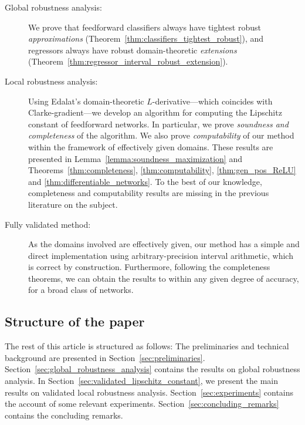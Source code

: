 \documentclass[11pt,times]{article}
\begin{document}
\begin{description}
\item[Global robustness analysis:] We prove that feedforward
  classifiers always have tightest robust \emph{approximations}
  (Theorem~\ref{thm:classifiers_tightest_robust}), and regressors always
  have robust domain-theoretic \emph{extensions}
  (Theorem~\ref{thm:regressor_interval_robust_extension}).


\item[Local robustness analysis:] Using Edalat's domain-theoretic
  $L$-derivative---which coincides with Clarke-gradient---we develop
  an algorithm for computing the Lipschitz constant of feedforward
  networks. In particular, we prove \emph{soundness and completeness}
  of the algorithm. We also prove \emph{computability} of our method
  within the framework of effectively given domains. These results are
  presented in Lemma~\ref{lemma:soundness_maximization} and
  Theorems~\ref{thm:completeness}, \ref{thm:computability},
  \ref{thm:gen_pos_ReLU} and \ref{thm:differentiable_networks}. To the
  best of our knowledge, completeness and computability results are
  missing in the previous literature on the subject.

\item[Fully validated method:] As the domains involved are effectively
  given, our method has a simple and direct implementation using
  arbitrary-precision interval arithmetic, which is correct by
  construction. Furthermore, following the completeness theorems, we
  can obtain the results to within any given degree of accuracy, for a
  broad class of networks. 

\end{description}




\subsection{Structure of the paper}

The rest of this article is structured as follows: The preliminaries
and technical background are presented in
Section~\ref{sec:preliminaries}. Section~\ref{sec:global_robustness_analysis}
contains the results on global robustness analysis. In
Section~\ref{sec:validated_lipschitz_constant}, we present the main
results on validated local robustness
analysis. Section~\ref{sec:experiments} contains the account of some
relevant experiments. Section~\ref{sec:concluding_remarks} contains
the concluding remarks.
\end{document}
